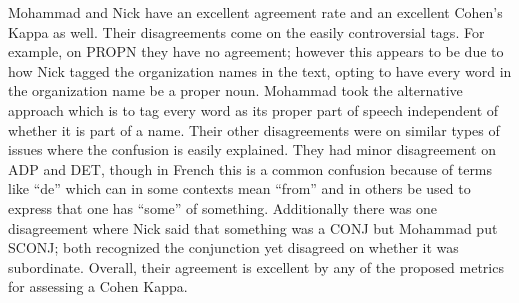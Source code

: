 \documentclass{article}\usepackage[]{graphicx}\usepackage[]{color}
\begin{document}
Mohammad and Nick have an excellent agreement rate and an excellent Cohen’s Kappa as well. Their disagreements come on the easily controversial tags. For example, on PROPN they have no agreement; however this appears to be due to how Nick tagged the organization names in the text, opting to have every word in the organization name be a proper noun. Mohammad took the alternative approach which is to tag every word as its proper part of speech independent of whether it is part of a name. Their other disagreements were on similar types of issues where the confusion is easily explained. They had minor disagreement on ADP and DET, though in French this is a common confusion because of terms like “de” which can in some contexts mean “from” and in others be used to express that one has “some” of something. Additionally there was one disagreement where Nick said that something was a CONJ but Mohammad put SCONJ; both recognized the conjunction yet disagreed on whether it was subordinate. Overall, their agreement is excellent by any of the proposed metrics for assessing a Cohen Kappa.
\end{document}
